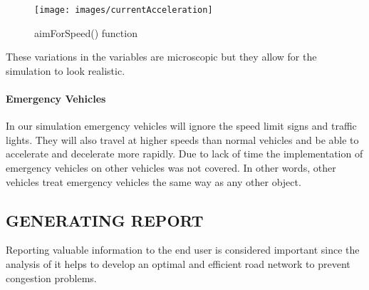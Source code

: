 \documentclass[11pt,a4paper]{article}
\begin{document}
	\begin{figure}[h!]
			\texttt{[image: images/currentAcceleration]}
			\caption{aimForSpeed() function}
			\centering
		\end{figure} 
  
  These variations in the variables are microscopic but they allow for the simulation to look realistic.
  
  	\paragraph{Emergency Vehicles}
  	
  	In our simulation emergency vehicles will ignore the speed limit signs and traffic lights. They will also travel at higher speeds than normal vehicles and be able to accelerate and decelerate more rapidly. 
Due to lack of time the implementation of emergency vehicles on other vehicles was not covered. In other words, other vehicles treat emergency vehicles the same way as any other object. 
  
  \subsection{GENERATING REPORT}
  Reporting valuable information to the end user is considered
  important since the analysis of it helps to develop an optimal and
  efficient road network to prevent congestion problems.
  
\end{document}
